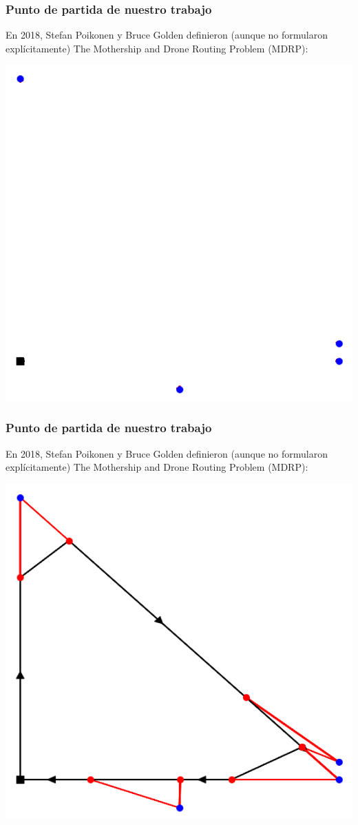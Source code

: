 \documentclass[slidestop,usepdftitle=false, xcolor=table]{beamer}
\begin{document}
	\begin{frame}
		\frametitle{Punto de partida de nuestro trabajo}
		En 2018, Stefan Poikonen y Bruce Golden definieron (aunque no formularon explícitamente) The Mothership and Drone Routing Problem (MDRP):
		\begin{center}
			\includegraphics[width=0.5\linewidth]{poikonen_2}
		\end{center}
	\end{frame}

	\begin{frame}
		\frametitle{Punto de partida de nuestro trabajo}
		En 2018, Stefan Poikonen y Bruce Golden definieron (aunque no formularon explícitamente) The Mothership and Drone Routing Problem (MDRP):
		\begin{center}
			\includegraphics[width=0.5\linewidth]{poikonen_1}
		\end{center}
	\end{frame}
\end{document}
